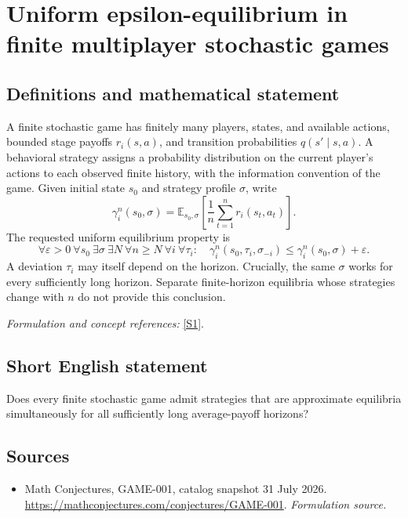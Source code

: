 \documentclass[11pt]{article}
\begin{document}
\section*{\texorpdfstring{Uniform epsilon-equilibrium in finite multiplayer stochastic games}{Uniform epsilon-equilibrium in finite multiplayer stochastic games}}\label{451}
\subsection{Definitions and mathematical statement}
A finite stochastic game has finitely many players, states, and available actions, bounded stage payoffs $r_i(s,a)$, and transition probabilities $q(s'\mid s,a)$. A behavioral strategy assigns a probability distribution on the current player's actions to each observed finite history, with the information convention of the game. Given initial state $s_0$ and strategy profile $\sigma$, write
\[
 \gamma_i^n(s_0,\sigma)={\mathbb{E}}_{s_0,\sigma}
 \left[\frac1n\sum_{t=1}^n r_i(s_t,a_t)\right].
\]
The requested uniform equilibrium property is
\[
 \forall{\varepsilon}>0\ \forall s_0\ \exists\sigma\ \exists N\
 \forall n\ge N\ \forall i\ \forall\tau_i:\quad
 \gamma_i^n(s_0,\tau_i,\sigma_{-i})
 \le\gamma_i^n(s_0,\sigma)+{\varepsilon}.
\]
A deviation $\tau_i$ may itself depend on the horizon. Crucially, the same $\sigma$ works for every sufficiently long horizon. Separate finite-horizon equilibria whose strategies change with $n$ do not provide this conclusion.
\par\smallskip\textit{Formulation and concept references:} \href{https://mathconjectures.com/conjectures/GAME-001}{[S1]}.

\subsection{Short English statement}
Does every finite stochastic game admit strategies that are approximate equilibria simultaneously for all sufficiently long average-payoff horizons?
\subsection{Sources}
\begin{itemize}
\item[S1]Math Conjectures, GAME-001, catalog snapshot 31 July 2026.
\url{https://mathconjectures.com/conjectures/GAME-001}.
\textit{Formulation source.}
\end{itemize}
\end{document}
